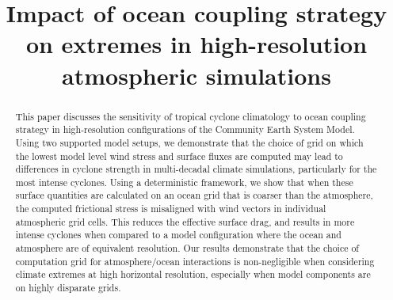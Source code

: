 \documentclass[gmd, manuscript]{copernicus}
\begin{document}
\nolinenumbers

\title{Impact of ocean coupling strategy on extremes in high-resolution atmospheric simulations}












\maketitle

\begin{abstract}

This paper discusses the sensitivity of tropical cyclone climatology to ocean coupling strategy in high-resolution configurations of the Community Earth System Model. Using two supported model setups, we demonstrate that the choice of grid on which the lowest model level wind stress and surface fluxes are computed may lead to differences in cyclone strength in multi-decadal climate simulations, particularly for the most intense cyclones. Using a deterministic framework, we show that when these surface quantities are calculated on an ocean grid that is coarser than the atmosphere, the computed frictional stress is misaligned with wind vectors in individual atmospheric grid cells. This reduces the effective surface drag, and results in more intense cyclones when compared to a model configuration where the ocean and atmosphere are of equivalent resolution. Our results demonstrate that the choice of computation grid for atmosphere/ocean interactions is non-negligible when considering climate extremes at high horizontal resolution, especially when model components are on highly disparate grids.

\end{abstract}
\end{document}
